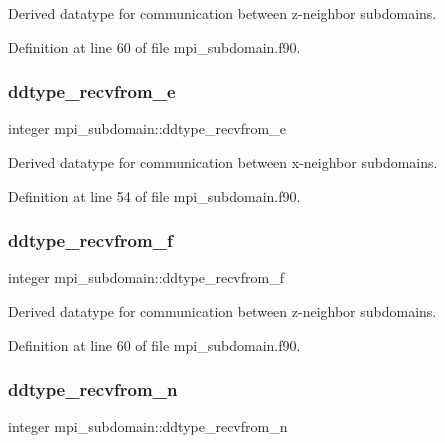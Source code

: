 Derived datatype for communication between z-\/neighbor subdomains. 



Definition at line 60 of file mpi\+\_\+subdomain.\+f90.

\mbox{\label{namespacempi__subdomain_a18a84c0f3ca27cd4dd73057ff035f341}} 
\subsubsection{\texorpdfstring{ddtype\_recvfrom\_e}{ddtype\_recvfrom\_e}}
{\footnotesize\ttfamily integer mpi\+\_\+subdomain\+::ddtype\+\_\+recvfrom\+\_\+e}



Derived datatype for communication between x-\/neighbor subdomains. 



Definition at line 54 of file mpi\+\_\+subdomain.\+f90.

\mbox{\label{namespacempi__subdomain_a4da19838e8bc3934ad5c24db424bec2c}} 
\subsubsection{\texorpdfstring{ddtype\_recvfrom\_f}{ddtype\_recvfrom\_f}}
{\footnotesize\ttfamily integer mpi\+\_\+subdomain\+::ddtype\+\_\+recvfrom\+\_\+f}



Derived datatype for communication between z-\/neighbor subdomains. 



Definition at line 60 of file mpi\+\_\+subdomain.\+f90.

\mbox{\label{namespacempi__subdomain_a74f1edb3c9227692b250285680518dc4}} 
\subsubsection{\texorpdfstring{ddtype\_recvfrom\_n}{ddtype\_recvfrom\_n}}
{\footnotesize\ttfamily integer mpi\+\_\+subdomain\+::ddtype\+\_\+recvfrom\+\_\+n}



